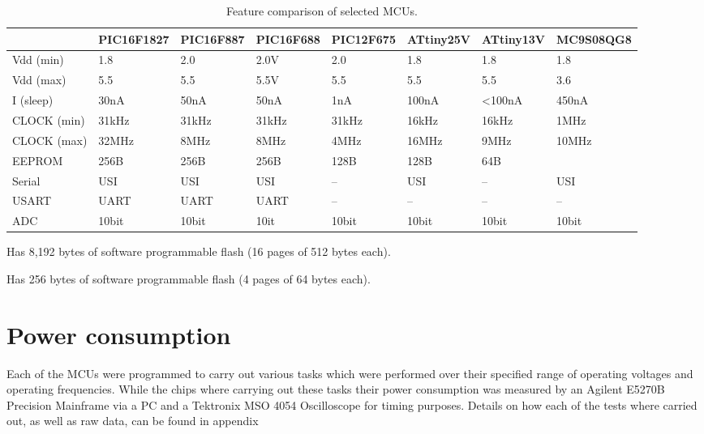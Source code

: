 \begin{table}
\begin{centering}
\begin{tabular}{|l|l|l|l|l|l|l|l|}
\cline{2-8}
\multicolumn{1}{l|}{} & PIC16F1827  & PIC16F887  & PIC16F688  & PIC12F675  & ATtiny25V  & ATtiny13V  & MC9S08QG8 \tabularnewline
\hline
Vdd (min)  & 1.8  & 2.0  & 2.0V  & 2.0  & 1.8  & 1.8  & 1.8 \tabularnewline
Vdd (max)  & 5.5  & 5.5  & 5.5V  & 5.5  & 5.5  & 5.5  & 3.6 \tabularnewline
I (sleep)  & 30nA  & 50nA  & 50nA  & 1nA  & 100nA & <100nA & 450nA\tabularnewline
CLOCK (min)  & 31kHz  & 31kHz & 31kHz & 31kHz & 16kHz & 16kHz & 1MHz \tabularnewline
CLOCK (max)  & 32MHz  & 8MHz  & 8MHz  & 4MHz  & 16MHz & 9MHz  & 10MHz\tabularnewline
EEPROM  & 256B  & 256B  & 256B  & 128B  & 128B  & 64B  & \dag{}\tabularnewline
Serial  & USI  & USI  & USI  & --  & USI  & --  & USI \tabularnewline
USART  & UART  & UART  & UART  & --  & --  & --  & -- \tabularnewline
ADC  & 10bit  & 10bit & 10it  & 10bit & 10bit & 10bit & 10bit\tabularnewline
\hline
\end{tabular}
\par\end{centering}

\begin{centering}
\dag Has 8,192 bytes of software programmable flash (16 pages of 512
bytes each).
\par\end{centering}

\begin{centering}
\ddag Has 256 bytes of software programmable flash (4 pages of 64
bytes each).
\par\end{centering}

\centering{}\protect\caption{\label{tab:MCUfeaturecomparison} Feature comparison of selected MCUs.}
\end{table}



\section{Power consumption}

Each of the MCUs were programmed to carry out various tasks which
were performed over their specified range of operating voltages and
operating frequencies. While the chips where carrying out these tasks
their power consumption was measured by an Agilent E5270B Precision
Mainframe via a PC and a Tektronix MSO 4054 Oscilloscope for timing
purposes. Details on how each of the tests where carried out, as well
as raw data, can be found in appendix %


